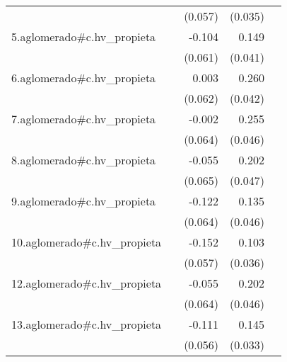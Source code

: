 {\begin{longtable}{l*{4}{D{.}{.}{-1}}}
            &                     &     (0.057)         &     (0.035)         &                     \\
\addlinespace
5.aglomerado#c.hv\_propieta&                     &      -0.104         &       0.149\sym{***}&                     \\
            &                     &     (0.061)         &     (0.041)         &                     \\
\addlinespace
6.aglomerado#c.hv\_propieta&                     &       0.003         &       0.260\sym{***}&                     \\
            &                     &     (0.062)         &     (0.042)         &                     \\
\addlinespace
7.aglomerado#c.hv\_propieta&                     &      -0.002         &       0.255\sym{***}&                     \\
            &                     &     (0.064)         &     (0.046)         &                     \\
\addlinespace
8.aglomerado#c.hv\_propieta&                     &      -0.055         &       0.202\sym{***}&                     \\
            &                     &     (0.065)         &     (0.047)         &                     \\
\addlinespace
9.aglomerado#c.hv\_propieta&                     &      -0.122         &       0.135\sym{**} &                     \\
            &                     &     (0.064)         &     (0.046)         &                     \\
\addlinespace
10.aglomerado#c.hv\_propieta&                     &      -0.152\sym{**} &       0.103\sym{**} &                     \\
            &                     &     (0.057)         &     (0.036)         &                     \\
\addlinespace
12.aglomerado#c.hv\_propieta&                     &      -0.055         &       0.202\sym{***}&                     \\
            &                     &     (0.064)         &     (0.046)         &                     \\
\addlinespace
13.aglomerado#c.hv\_propieta&                     &      -0.111\sym{*}  &       0.145\sym{***}&                     \\
            &                     &     (0.056)         &     (0.033)         &                     \\

\end{longtable}}
